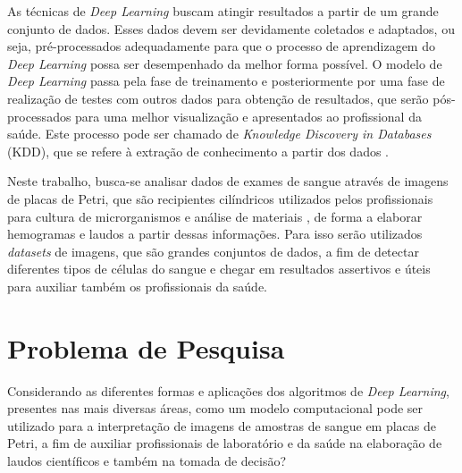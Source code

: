 As técnicas de \emph{Deep Learning} buscam atingir resultados a partir de um grande conjunto de dados. Esses dados devem ser devidamente coletados e adaptados, ou seja, pré-processados adequadamente para que o processo de aprendizagem do \emph{Deep Learning} possa ser desempenhado da melhor forma possível. O modelo de \emph{Deep Learning} passa pela fase de treinamento e posteriormente por uma fase de realização de testes com outros dados para obtenção de resultados, que serão pós-processados para uma melhor visualização e apresentados ao profissional da saúde. Este processo pode ser chamado de \emph{Knowledge Discovery in Databases} (KDD), que se refere à extração de conhecimento a partir dos dados \cite{kdd, kdd2}.

Neste trabalho, busca-se analisar dados de exames de sangue através de imagens de placas de Petri, que são recipientes cilíndricos utilizados pelos profissionais para cultura de microrganismos e análise de materiais \cite{petri}, de forma a elaborar hemogramas e laudos a partir dessas informações. Para isso serão utilizados \emph{datasets} de imagens, que são grandes conjuntos de dados, a fim de detectar diferentes tipos de células do sangue e chegar em resultados assertivos e úteis para auxiliar também os profissionais da saúde.


\section{Problema de Pesquisa}
\label{sec:problema}

Considerando as diferentes formas e aplicações dos algoritmos de \emph{Deep Learning}, presentes nas mais diversas áreas, como um modelo computacional pode ser utilizado para a interpretação de imagens de amostras de sangue em placas de Petri, a fim de auxiliar profissionais de laboratório e da saúde na elaboração de laudos científicos e também na tomada de decisão?


